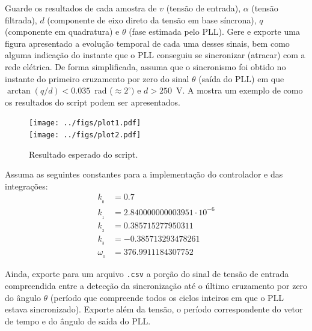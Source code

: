 Guarde os resultados de cada amostra de $v$ (tensão de entrada), $\alpha$ (tensão filtrada), $d$ (componente de eixo direto da tensão em base
síncrona), $q$ (componente em quadratura) e $\theta$ (fase estimada pelo PLL).
Gere e exporte uma figura apresentado a evolução temporal de cada uma desses sinais, bem como alguma indicação do instante que o PLL conseguiu se
sincronizar (atracar) com a rede elétrica.
De forma simplificada, assuma que o sincronismo foi obtido no instante do primeiro cruzamento por zero do sinal $\theta$ (saída do PLL) em que
$\arctan(q/d) < 0.035$~rad ($\approx 2^\circ)$ e $d > 250$~V. A  mostra um exemplo de como os resultados do script podem ser
apresentados.
\begin{figure}[htbp]
    \centering
    \texttt{[image: ../figs/plot1.pdf]}\\
    \vspace{-16pt}
    \texttt{[image: ../figs/plot2.pdf]}
    \caption{Resultado esperado do script.}
    \label{fig:plot}
\end{figure}

Assuma as seguintes constantes para a implementação do controlador e das integrações:
\begin{equation}\label{eq:cont}
    \begin{aligned}
        k_{_0} &= 0.7 \\
        k_{_1} &= 2.840000000003951\cdot 10^{-6} \\
        k_{_2} &= 0.385715277950311 \\
        k_{_3} &= -0.385713293478261 \\
        \omega_{_0} &= 376.9911184307752
    \end{aligned}
\end{equation}

Ainda, exporte para um arquivo \texttt{.csv} a porção do sinal de tensão de entrada compreendida entre a detecção da sincronização até o último
cruzamento por zero do ângulo $\theta$ (período que compreende todos os ciclos inteiros em que o PLL estava sincronizado).
Exporte além da tensão, o período correspondente do vetor de tempo e do ângulo de saída do PLL.

